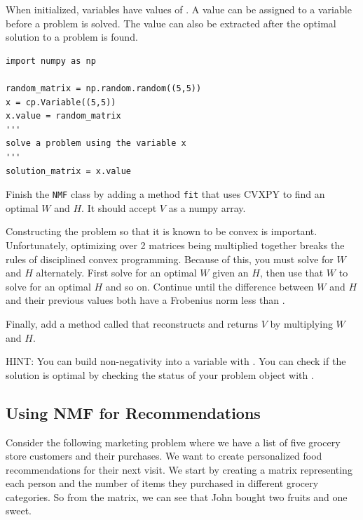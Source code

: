 When initialized, variables have values of .
A value can be assigned to a variable before a problem is solved.
The value can also be extracted after the optimal solution to a problem is found.
\begin{lstlisting}
import numpy as np

random_matrix = np.random.random((5,5))
x = cp.Variable((5,5))
x.value = random_matrix
'''
solve a problem using the variable x
'''
solution_matrix = x.value
\end{lstlisting}



\begin{problem}
Finish the \texttt{NMF} class by adding a method \texttt{fit} that uses CVXPY to find an optimal $W$ and $H$.
It should accept $V$ as a numpy array.

Constructing the problem so that it is known to be convex is important.
Unfortunately, optimizing over 2 matrices being multiplied together breaks the rules of disciplined convex programming.
Because of this, you must solve for $W$ and $H$ alternately. First solve for an optimal $W$ given an $H$, then use that $W$ to solve for an optimal $H$ and so on. Continue until the difference between $W$ and $H$ and their previous values both have a Frobenius norm less than .

Finally, add a method called  that reconstructs and returns $V$ by multiplying $W$ and $H$.  

HINT: You can build non-negativity into a  variable with .
You can check if the solution is optimal by checking the status of your problem object with .
\end{problem}


\subsection*{Using NMF for Recommendations}

Consider the following marketing problem where we have a list of five grocery store customers and their purchases.
We want to create personalized food recommendations for their next visit. 
We start by creating a matrix representing each person and the number of items they purchased in different grocery categories.
So from the matrix, we can see that John bought two fruits and one sweet.
%

